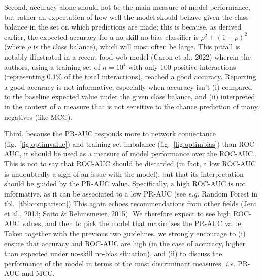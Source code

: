 \documentclass[11pt]{article}
\begin{document}
Second, accuracy alone should not be the main measure of model
performance, but rather an expectation of how well the model should
behave given the class balance in the set on which predictions are made;
this is because, as derived earlier, the expected accuracy for a
no-skill no-bias classifier is \(\rho^2 + (1-\rho)^2\) (where \(\rho\)
is the class balance), which will most often be large. This pitfall is
notably illustrated in a recent food-web model (Caron et al., 2022)
wherein the authors, using a training set of \(n = 10^4\) with only 100
positive interactions (representing 0.1\% of the total interactions),
reached a good accuracy. Reporting a good accuracy is not informative,
especially when accuracy isn't (i) compared to the baseline expected
value under the given class balance, and (ii) interpreted in the context
of a measure that is not sensitive to the chance prediction of many
negatives (like MCC).

Third, because the PR-AUC responds more to network connectance
(fig.~\ref{fig:optimvalue}) and training set imbalance
(fig.~\ref{fig:optimbias}) than ROC-AUC, it should be used as a measure
of model performance over the ROC-AUC. This is not to say that ROC-AUC
should be discarded (in fact, a low ROC-AUC is undoubtedly a sign of an
issue with the model), but that its interpretation should be guided by
the PR-AUC value. Specifically, a high ROC-AUC is not informative, as it
can be associated to a low PR-AUC (see \emph{e.g.} Random Forest in
tbl.~\ref{tbl:comparison}) This again echoes recommendations from other
fields (Jeni et al., 2013; Saito \& Rehmsmeier, 2015). We therefore
expect to see high ROC-AUC values, and then to pick the model that
maximizes the PR-AUC value. Taken together with the previous two
guidelines, we strongly encourage to (i) ensure that accuracy and
ROC-AUC are high (in the case of accuracy, higher than expected under
no-skill no-bias situation), and (ii) to discuss the performance of the
model in terms of the most discriminant measures, \emph{i.e.} PR-AUC and
MCC.
\end{document}
